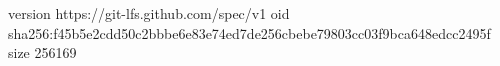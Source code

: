 version https://git-lfs.github.com/spec/v1
oid sha256:f45b5e2cdd50c2bbbe6e83e74ed7de256cbebe79803cc03f9bca648edcc2495f
size 256169
